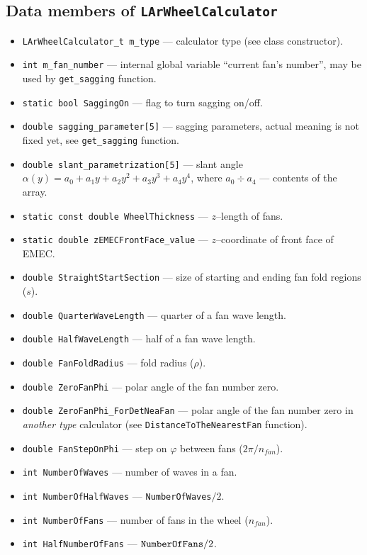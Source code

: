\documentclass{article}
\begin{document}
\subsection{Data members of {\tt LArWheelCalculator}}
\begin{itemize}
\item {\tt LArWheelCalculator\_t m\_type} --- calculator type (see class
constructor).
\item {\tt int m\_fan\_number} --- internal global variable 
``current fan's number'', may be used
by {\tt get\_sagging} function.
\item {\tt static bool SaggingOn} --- flag to turn sagging on/off.
\item {\tt double sagging\_parameter[5]} --- sagging parameters, actual meaning
is not fixed yet, see {\tt get\_sagging} function.
\item {\tt double slant\_parametrization[5]} --- slant angle $\alpha(y) = a_0 +
a_1y + a_2y^2 + a_3y^3 + a_4y^4$, where $a_0 \div a_4$ --- contents of the
array.
\item {\tt static const double WheelThickness} --- $z$--length of fans.
\item {\tt static double zEMECFrontFace\_value} --- $z$--coordinate of front
face of EMEC.
\item {\tt double StraightStartSection} --- size of starting and
ending fan fold regions ($s$).
\item {\tt double QuarterWaveLength} --- quarter of a fan wave length.
\item {\tt double HalfWaveLength} --- half of a fan wave length.
\item {\tt double FanFoldRadius} --- fold radius ($\rho$).
\item {\tt double ZeroFanPhi} --- polar angle of the fan number zero.
\item {\tt double ZeroFanPhi\_ForDetNeaFan} --- polar angle of the fan number
zero in {\em another type} calculator (see {\tt DistanceToTheNearestFan}
function).
\item {\tt double FanStepOnPhi} --- step on $\varphi$ between fans
($2\pi / n_{fan}$).
\item {\tt int NumberOfWaves} --- number of waves in a fan.
\item {\tt int NumberOfHalfWaves} --- {\tt NumberOfWaves}$ / 2$.
\item {\tt int NumberOfFans} --- number of fans in the wheel ($n_{fan}$).
\item {\tt int HalfNumberOfFans} --- ${\tt NumberOfFans} / 2$.

\end{itemize}
\end{document}
